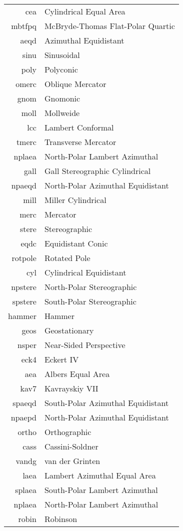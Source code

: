 \begin{tabular}{r@{ }l}
cea &	Cylindrical Equal Area\\
mbtfpq &	McBryde-Thomas Flat-Polar Quartic\\
aeqd &	Azimuthal Equidistant\\
sinu &	Sinusoidal\\
poly &	Polyconic\\
omerc &	Oblique Mercator\\
gnom &	Gnomonic\\
moll &	Mollweide\\
lcc &	Lambert Conformal\\
tmerc &	Transverse Mercator\\
nplaea &	North-Polar Lambert Azimuthal\\
gall &	Gall Stereographic Cylindrical\\
npaeqd &	North-Polar Azimuthal Equidistant\\
mill &	Miller Cylindrical\\
merc &	Mercator\\
stere &	Stereographic\\
eqdc &	Equidistant Conic\\
rotpole &	Rotated Pole\\
cyl &	Cylindrical Equidistant\\
npstere &	North-Polar Stereographic\\
spstere &	South-Polar Stereographic\\
hammer &	Hammer\\
geos &	Geostationary\\
nsper &	Near-Sided Perspective\\
eck4 &	Eckert IV\\
aea &	Albers Equal Area\\
kav7 &	Kavrayskiy VII\\
spaeqd &	South-Polar Azimuthal Equidistant\\
npaepd & North-Polar Azimuthal Equidistant\\
ortho &	Orthographic\\
cass &	Cassini-Soldner\\
vandg& 	van der Grinten\\
laea &	Lambert Azimuthal Equal Area\\
splaea &	South-Polar Lambert Azimuthal\\
nplaea & North-Polar Lambert Azimuthal\\
robin &	Robinson
\end{tabular}


